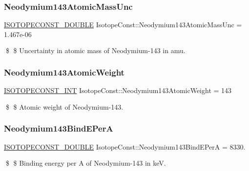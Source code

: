 \subsubsection{\texorpdfstring{Neodymium143\+Atomic\+Mass\+Unc}{Neodymium143AtomicMassUnc}}
{\footnotesize\ttfamily \mbox{\hyperlink{group___isotope_const-_macros_ga8f45a7272ce02c0b4c65c44636ed719a}{I\+S\+O\+T\+O\+P\+E\+C\+O\+N\+S\+T\+\_\+\+D\+O\+U\+B\+LE}} Isotope\+Const\+::\+Neodymium143\+Atomic\+Mass\+Unc = 1.\+467e-\/06}

\$ \$ Uncertainty in atomic mass of Neodymium-\/143 in amu. \mbox{\label{group___isotope_const-_neodymium-_nd143_gaf2e11332cb5d589ba3afa2eae5cc2108}} 
\subsubsection{\texorpdfstring{Neodymium143\+Atomic\+Weight}{Neodymium143AtomicWeight}}
{\footnotesize\ttfamily \mbox{\hyperlink{group___isotope_const-_macros_ga5f18360b3e99483a35c32d789e62621c}{I\+S\+O\+T\+O\+P\+E\+C\+O\+N\+S\+T\+\_\+\+I\+NT}} Isotope\+Const\+::\+Neodymium143\+Atomic\+Weight = 143}

\$ \$ Atomic weight of Neodymium-\/143. \mbox{\label{group___isotope_const-_neodymium-_nd143_gaf7315b0a39efadb4834912976ef09b1b}} 
\subsubsection{\texorpdfstring{Neodymium143\+Bind\+E\+PerA}{Neodymium143BindEPerA}}
{\footnotesize\ttfamily \mbox{\hyperlink{group___isotope_const-_macros_ga8f45a7272ce02c0b4c65c44636ed719a}{I\+S\+O\+T\+O\+P\+E\+C\+O\+N\+S\+T\+\_\+\+D\+O\+U\+B\+LE}} Isotope\+Const\+::\+Neodymium143\+Bind\+E\+PerA = 8330.}

\$ \$ Binding energy per A of Neodymium-\/143 in keV. \mbox{\label{group___isotope_const-_neodymium-_nd143_ga0d4e12f20ffa1a853bf6dddaa70026a5}} 
